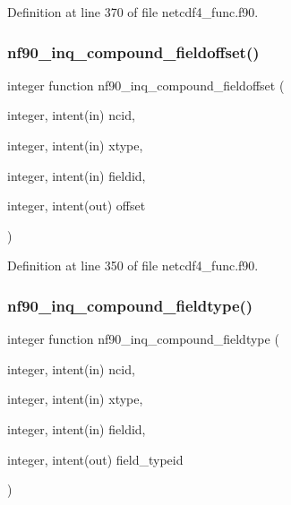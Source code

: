 Definition at line 370 of file netcdf4\+\_\+func.\+f90.

\mbox{\label{netcdf4__func_8f90_aacc8100184a9f6fc10217f28f78bc69b}} 
\subsubsection{\texorpdfstring{nf90\+\_\+inq\+\_\+compound\+\_\+fieldoffset()}{nf90\_inq\_compound\_fieldoffset()}}
{\footnotesize\ttfamily integer function nf90\+\_\+inq\+\_\+compound\+\_\+fieldoffset (\begin{DoxyParamCaption}\item[{integer, intent(in)}]{ncid,  }\item[{integer, intent(in)}]{xtype,  }\item[{integer, intent(in)}]{fieldid,  }\item[{integer, intent(out)}]{offset }\end{DoxyParamCaption})}



Definition at line 350 of file netcdf4\+\_\+func.\+f90.

\mbox{\label{netcdf4__func_8f90_a470f28d80eea9a7d1805484db9ff55ac}} 
\subsubsection{\texorpdfstring{nf90\+\_\+inq\+\_\+compound\+\_\+fieldtype()}{nf90\_inq\_compound\_fieldtype()}}
{\footnotesize\ttfamily integer function nf90\+\_\+inq\+\_\+compound\+\_\+fieldtype (\begin{DoxyParamCaption}\item[{integer, intent(in)}]{ncid,  }\item[{integer, intent(in)}]{xtype,  }\item[{integer, intent(in)}]{fieldid,  }\item[{integer, intent(out)}]{field\+\_\+typeid }\end{DoxyParamCaption})}



